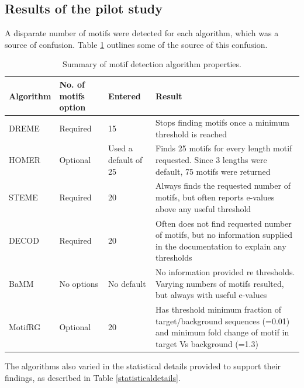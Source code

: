 \documentclass[12pt]{article}
\begin{document}
\subsection{Results of the pilot study}

A disparate number of motifs were detected for each algorithm, which was a source of confusion. Table \ref{motif_summary} outlines some of the source of this confusion.

\begin{table}
\centering
\caption{Summary of motif detection algorithm properties.}\label{motif_summary}
\begin{tabular}{| p{2cm} |  p{2cm} |  p{2cm} |  p{6cm} |}
\hline
\textbf{Algorithm} & \textbf{No. of motifs option} & \textbf{Entered} & \textbf{Result}\\
\hline
DREME & Required & 15 & Stops finding motifs once a minimum threshold is reached\\
\hline
HOMER & Optional & Used a default of 25 & Finds 25 motifs for every length motif requested. Since 3 lengths were default, 75 motifs were returned\\
\hline
STEME & Required & 20 & Always finds the requested number of motifs, but often reports e-values above any useful threshold\\
\hline
DECOD & Required & 20 & Often does not find requested number of motifs, but no information supplied in the documentation to explain any thresholds\\
\hline
BaMM & No options & No default & No information provided re thresholds. Varying numbers of motifs resulted, but always with useful e-values\\
\hline
MotifRG & Optional & 20	& Has threshold minimum fraction of target/background sequences (=0.01) and minimum fold change of motif in target Vs background (=1.3)\\
\hline

\end{tabular}
\end{table}


The algorithms also varied in the statistical details provided to support their findings, as described in Table \ref{statisticaldetails}.
\end{document}
